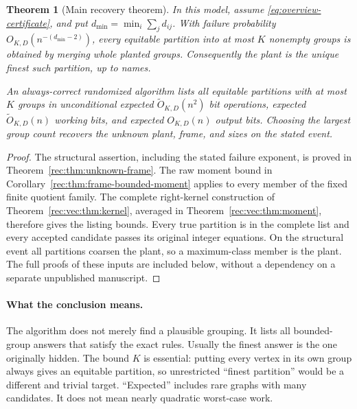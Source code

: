 \documentclass[11pt]{article}
\newtheorem{theorem}{Theorem}[section]
\theoremstyle{definition}
\theoremstyle{remark}
\newcommand{\1}{\mathbf 1}
\begin{document}
\begin{theorem}[Main recovery theorem]\label{thm:report-recovery}
In this model, assume \eqref{eq:overview-certificate}, and put
$d_{\min}=\min_i\sum_jd_{ij}$. With failure probability
$O_{K,D}(n^{-(d_{\min}-2)})$, every equitable partition into at most $K$
nonempty groups is obtained by merging whole planted groups.
Consequently the plant is the unique finest such partition, up to names.

An always-correct randomized algorithm lists all equitable partitions
with at most $K$ groups in unconditional expected
$\widetilde O_{K,D}(n^2)$ bit operations, expected
$\widetilde O_{K,D}(n)$ working bits, and expected $O_{K,D}(n)$ output
bits. Choosing the largest group count recovers the unknown plant,
frame, and sizes on the stated event.
\end{theorem}
\begin{proof}
The structural assertion, including the stated failure exponent, is
proved in Theorem~\ref{rec:thm:unknown-frame}. The raw moment bound in
Corollary~\ref{rec:thm:frame-bounded-moment} applies to every member of the
fixed finite quotient family. The complete right-kernel construction
of Theorem~\ref{rec:vec:thm:kernel}, averaged in
Theorem~\ref{rec:vec:thm:moment}, therefore gives the listing bounds.
Every true partition is in the complete list and every accepted candidate
passes its original integer equations. On the structural event all
partitions coarsen the plant, so a maximum-class member is the plant.
The full proofs of these inputs are included below, without a dependency
on a separate unpublished manuscript.
\end{proof}

\paragraph{What the conclusion means.}
The algorithm does not merely find a plausible grouping. It lists all
bounded-group answers that satisfy the exact rules. Usually the finest
answer is the one originally hidden. The bound $K$ is essential:
putting every vertex in its own group always gives an equitable
partition, so unrestricted ``finest partition'' would be a different
and trivial target. ``Expected'' includes rare graphs with many
candidates. It does not mean nearly quadratic worst-case work.
\end{document}
